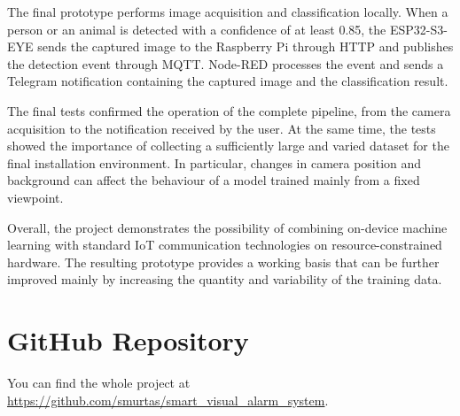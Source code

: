 \documentclass{article}
\begin{document}
The final prototype performs image acquisition and classification locally.
When a person or an animal is detected with a confidence of at least 0.85,
the ESP32-S3-EYE sends the captured image to the Raspberry Pi through HTTP
and publishes the detection event through MQTT. Node-RED processes the event
and sends a Telegram notification containing the captured image and the
classification result.

The final tests confirmed the operation of the complete pipeline, from the
camera acquisition to the notification received by the user. At the same
time, the tests showed the importance of collecting a sufficiently large
and varied dataset for the final installation environment. In particular,
changes in camera position and background can affect the behaviour of a
model trained mainly from a fixed viewpoint.

Overall, the project demonstrates the possibility of combining on-device
machine learning with standard IoT communication technologies on
resource-constrained hardware. The resulting prototype provides a working
basis that can be further improved mainly by increasing the quantity and
variability of the training data.

\section{GitHub Repository}

You can find the whole project at \url{https://github.com/smurtas/smart_visual_alarm_system}.



\end{document}
